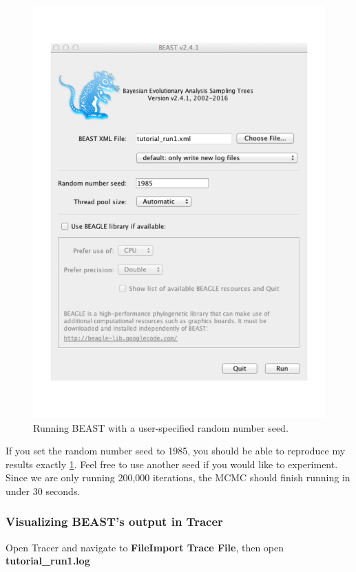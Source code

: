 \documentclass[11pt]{article}
\begin{document}
\begin{figure}[!h]
\centering
\includegraphics[scale=0.4]{figures/beast_input_run1}
\caption{\small Running BEAST with a user-specified random number seed.}
\label{fig:beast_run1}
\end{figure}

If you set the random number seed to 1985, you should be able to reproduce my results exactly \ref{fig:beast_run1}. Feel free to use another seed if you would like to experiment. Since we are only running 200,000 iterations, the MCMC should finish running in under $30$ seconds.

\bigskip
\subsubsection{Visualizing BEAST's output in Tracer}

\begin{framed}
Open Tracer and navigate to \textbf{File\textrightarrow Import Trace File}, then open \textbf{tutorial\_run1.log}
\end{framed}
\end{document}
